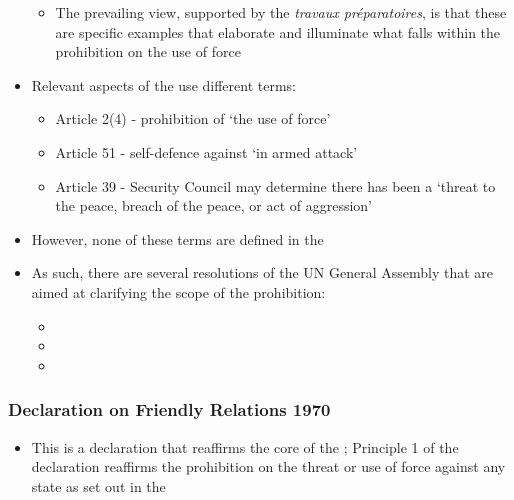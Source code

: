 \begin{itemize}
    \begin{itemize}
        \item The prevailing view, supported by the \textit{travaux préparatoires}, is that these are specific examples that elaborate and illuminate what falls within the prohibition on the use of force
    \end{itemize}
    \item Relevant aspects of the  use different terms:
    \begin{itemize}
        \item Article 2(4) - prohibition of `the use of force'
        \item Article 51 - self-defence against `in armed attack'
        \item Article 39 - Security Council may determine there has been a `threat to the peace, breach of the peace, or act of aggression'
    \end{itemize}
    \item However, none of these terms are defined in the 
    \item As such, there are several resolutions of the UN General Assembly that are aimed at clarifying the scope of the prohibition:
    \begin{itemize}
        \item {}
        \item {}
        \item {}
    \end{itemize}
\end{itemize}

\subsubsection{Declaration on Friendly Relations 1970}
\begin{itemize}
    \item This is a declaration that reaffirms the core of the ; Principle 1 of the declaration reaffirms the prohibition on the threat or use of force against any state as set out in the 
\end{itemize}

